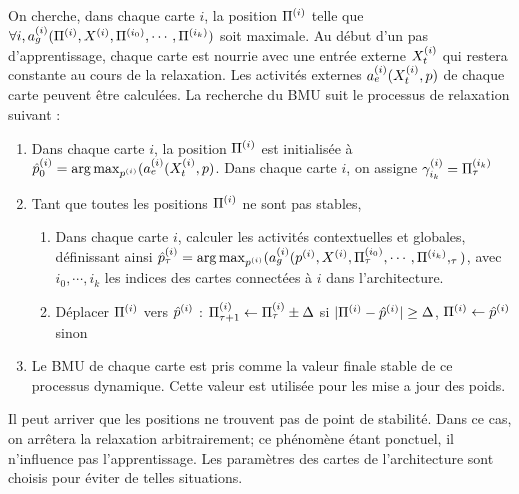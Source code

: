 On cherche, dans chaque carte $i$, la position $\Pi^{({i})}$ telle que $\forall i, a_g^{({i})}(\Pi^{({i})},X^{({i})},\Pi^{({i_0})},\cdots,\Pi^{({i_k})})$ soit maximale.
Au début d'un pas d'apprentissage, chaque carte est nourrie avec une entrée externe $X^{({i})}_t$ qui restera constante au cours de la relaxation. Les activités externes $a_e^{({i})}(X^{({i})}_t,p)$ de chaque carte peuvent être calculées.
La recherche du BMU suit le processus de relaxation suivant :
\begin{enumerate}
\item Dans chaque carte $i$, la position $\Pi^{({i})}$ est initialisée à $\hat{p}^{({i})}_0 = \operatorname*{arg\,max}_{p^{({i})}}(a_e^{({i})}(X^{({i})}_t,p)$. Dans chaque carte $i$, on assigne $\gamma_{i_k}^{({i})} = \Pi^{({i_k})}_\tau$
\item Tant que toutes les positions $\Pi^{({i})}$ ne sont pas stables, 
	\begin{enumerate}
	\item Dans chaque carte $i$, calculer les activités contextuelles et globales, définissant ainsi $\hat{p}^{({i})}_\tau = \operatorname*{arg\,max}_{p^{({i})}}(a_g^{({i})}(p^{({i})},X^{({i})}, \Pi^{({i_0})}_\tau,\cdots,\Pi^{({i_k})},_\tau)$, avec $i_0, \cdots, i_k$ les indices des cartes connectées à $i$ dans l'architecture.
	\item Déplacer $\Pi^{({i})}$ vers $\hat{p}^{({i})}$ : $\Pi^{({i})}_{\tau +1} \leftarrow \Pi^{({i})}_\tau \pm \Delta$ si $\lvert \Pi^{({i})}- \hat{p}^{({i})}\rvert \geq \Delta$, $\Pi^{({i})} \leftarrow \hat{p}^{({i})}$ sinon
	\end{enumerate}
\item Le BMU de chaque carte est pris comme la valeur finale stable de ce processus dynamique. Cette valeur est utilisée pour les mise a jour des poids.
\end{enumerate}

Il peut arriver que les positions ne trouvent pas de point de stabilité. Dans ce cas, on arrêtera la relaxation arbitrairement; ce phénomène étant ponctuel, il n'influence pas l'apprentissage. Les paramètres des cartes de l'architecture sont choisis pour éviter de telles situations.

